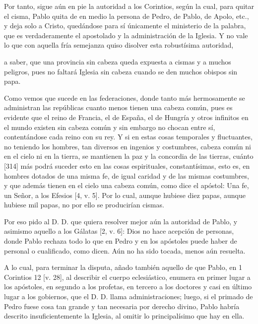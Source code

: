 Por tanto, sigue aún en pie la autoridad a los Corintios, según la cual, para quitar el cisma, Pablo quita de en medio la persona de Pedro, de Pablo, de Apolo, etc., y deja solo a Cristo, quedándose para sí únicamente el ministerio de la palabra, que es verdaderamente el apostolado y la administración de la Iglesia. Y no vale lo que con aquella fría semejanza quiso disolver esta robustísima autoridad,

a saber, que una provincia sin cabeza queda expuesta a cismas y a muchos peligros, pues no faltará Iglesia sin cabeza cuando se den muchos obispos sin papa.

Como vemos que sucede en las federaciones, donde tanto más hermosamente se administran las repúblicas cuanto menos tienen una cabeza común, pues es evidente que el reino de Francia, el de España, el de Hungría y otros infinitos en el mundo existen sin cabeza común y sin embargo no chocan entre sí, contentándose cada reino con su rey. Y si en estas cosas temporales y fluctuantes, no teniendo los hombres, tan diversos en ingenios y costumbres, cabeza común ni en el cielo ni en la tierra, se mantienen la paz y la concordia de las tierras, cuánto [314] más podrá suceder esto en las cosas espirituales, constantísimas, esto es, en hombres dotados de una misma fe, de igual caridad y de las mismas costumbres, y que además tienen en el cielo una cabeza común, como dice el apóstol: Una fe, un Señor, a los Efesios [4, v. 5]. Por lo cual, aunque hubiese diez papas, aunque hubiese mil papas, no por ello se producirían cismas.

Por eso pido al D. D. que quiera resolver mejor aún la autoridad de Pablo, y asimismo aquello a los Gálatas [2, v. 6]: Dios no hace acepción de personas, donde Pablo rechaza todo lo que en Pedro y en los apóstoles puede haber de personal o cualificado, como dicen. Aún no ha sido tocada, menos aún resuelta.

A lo cual, para terminar la disputa, añado también aquello de que Pablo, en 1 Corintios 12 [v. 28], al describir el cuerpo eclesiástico, enumera en primer lugar a los apóstoles, en segundo a los profetas, en tercero a los doctores y casi en último lugar a los gobiernos, que el D. D. llama administraciones; luego, si el primado de Pedro fuese cosa tan grande y tan necesaria por derecho divino, Pablo habría descrito insuficientemente la Iglesia, al omitir lo principalísimo que hay en ella.

